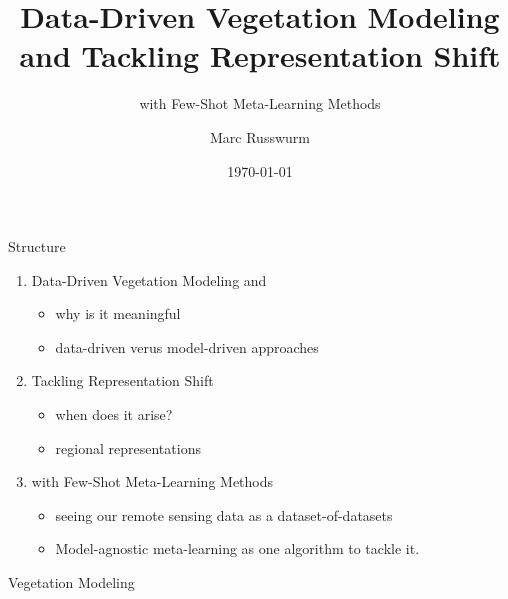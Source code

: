 \documentclass[11pt]{beamer}
\begin{document}
	
	\title{Data-Driven Vegetation Modeling and Tackling Representation Shift}
	\subtitle{with Few-Shot Meta-Learning Methods}
	\author{Marc Russwurm}
	\date{\today}
	
	
	\begin{frame}[plain]
		\maketitle
	\end{frame}

	\begin{frame}{Structure}
		
		\begin{enumerate}
			\item Data-Driven Vegetation Modeling and 
			\begin{itemize}
				\item why is it meaningful
				\item data-driven verus model-driven approaches
			\end{itemize}
			\item<2-> Tackling Representation Shift 
			\begin{itemize}
				\item when does it arise?
				\item regional representations
			\end{itemize}
			\item<3> with Few-Shot Meta-Learning Methods
			\begin{itemize}
				\item seeing our remote sensing data as a dataset-of-datasets
				\item Model-agnostic meta-learning as one algorithm to tackle it.
			\end{itemize}
		\end{enumerate}
		
	\end{frame}

	\begin{frame}{Vegetation Modeling}
	\end{frame}
\end{document}
